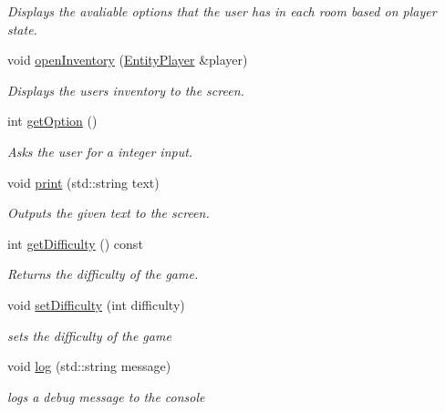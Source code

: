 \begin{DoxyCompactItemize}
\begin{DoxyCompactList}\small\item\em Displays the avaliable options that the user has in each room based on player state. \item\end{DoxyCompactList}\item 
void \hyperlink{classGame_a51c860f2a6051188585946859efa2967}{openInventory} (\hyperlink{classEntityPlayer}{EntityPlayer} \&player)
\begin{DoxyCompactList}\small\item\em Displays the users inventory to the screen. \item\end{DoxyCompactList}\item 
int \hyperlink{classGame_a91643d2e9ede2dfa552339db06ff52bf}{getOption} ()
\begin{DoxyCompactList}\small\item\em Asks the user for a integer input. \item\end{DoxyCompactList}\item 
void \hyperlink{classGame_ad94d7beb2a5072ee2d8379cce4962ced}{print} (std::string text)
\begin{DoxyCompactList}\small\item\em Outputs the given text to the screen. \item\end{DoxyCompactList}\item 
int \hyperlink{classGame_aa52fc612f751e30daeacc15661472628}{getDifficulty} () const 
\begin{DoxyCompactList}\small\item\em Returns the difficulty of the game. \item\end{DoxyCompactList}\item 
void \hyperlink{classGame_acf32945c92475ff25c296b38b9090d7a}{setDifficulty} (int difficulty)
\begin{DoxyCompactList}\small\item\em sets the difficulty of the game \item\end{DoxyCompactList}\item 
void \hyperlink{classGame_a090e1f20d57b782a93b5b61c8b6f15b8}{log} (std::string message)
\begin{DoxyCompactList}\small\item\em logs a debug message to the console \item\end{DoxyCompactList}\item 

\end{DoxyCompactItemize}
